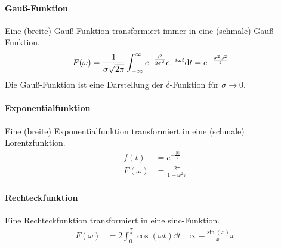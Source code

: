 \paragraph{Gauß-Funktion} Eine (breite) Gauß-Funktion transformiert
immer in eine (schmale) Gauß-Funktion.
\begin{align*}
	F(\omega) &= \frac{1}{\sigma\sqrt{2\pi}}\int_{-\infty}^{\infty}
                e^{-\frac{t^2}{2\sigma^2}} e^{-i\omega t} \mathrm{d} t
                = e^{-\frac{\sigma^2\omega^2}{2}}
\end{align*}
Die Gauß-Funktion ist eine Darstellung der $\delta$-Funktion für
$\sigma\longrightarrow 0$.

\paragraph{Exponentialfunktion} Eine (breite) Exponentialfunktion
transformiert in eine (schmale) Lorentzfunktion.
\begin{align*}
	f(t) &= e^{-\frac{\vert t\vert}{\tau}}\\
	F(\omega) &= \frac{2\tau}{1+\omega^2\tau}
\end{align*}

\paragraph{Rechteckfunktion} Eine Rechteckfunktion transformiert in
eine sinc-Funktion.
\begin{align*}
  F(\omega) &= 2\int_{0}^{\frac{T}{2}}\cos(\omega t)\dd t
  &\propto -\frac{\sin(x)}{x} x
\end{align*}


